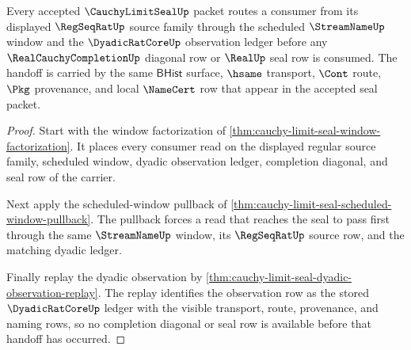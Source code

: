\begin{theorem}
\label{thm:cauchy-limit-seal-regseq-stream-dyadic-handoff}
Every accepted $\CauchyLimitSealUp$ packet routes a consumer from its displayed $\RegSeqRatUp$ source family through the scheduled $\StreamNameUp$ window and the $\DyadicRatCoreUp$ observation ledger before any $\RealCauchyCompletionUp$ diagonal row or $\RealUp$ seal row is consumed. The handoff is carried by the same $\mathsf{BHist}$ surface, $\hsame$ transport, $\Cont$ route, $\Pkg$ provenance, and local $\NameCert$ row that appear in the accepted seal packet.
\end{theorem}
\begin{proof}
Start with the window factorization of \autoref{thm:cauchy-limit-seal-window-factorization}. It places every consumer read on the displayed regular source family, scheduled window, dyadic observation ledger, completion diagonal, and seal row of the carrier.

Next apply the scheduled-window pullback of \autoref{thm:cauchy-limit-seal-scheduled-window-pullback}. The pullback forces a read that reaches the seal to pass first through the same $\StreamNameUp$ window, its $\RegSeqRatUp$ source row, and the matching dyadic ledger.

Finally replay the dyadic observation by \autoref{thm:cauchy-limit-seal-dyadic-observation-replay}. The replay identifies the observation row as the stored $\DyadicRatCoreUp$ ledger with the visible transport, route, provenance, and naming rows, so no completion diagonal or seal row is available before that handoff has occurred.
\end{proof}

